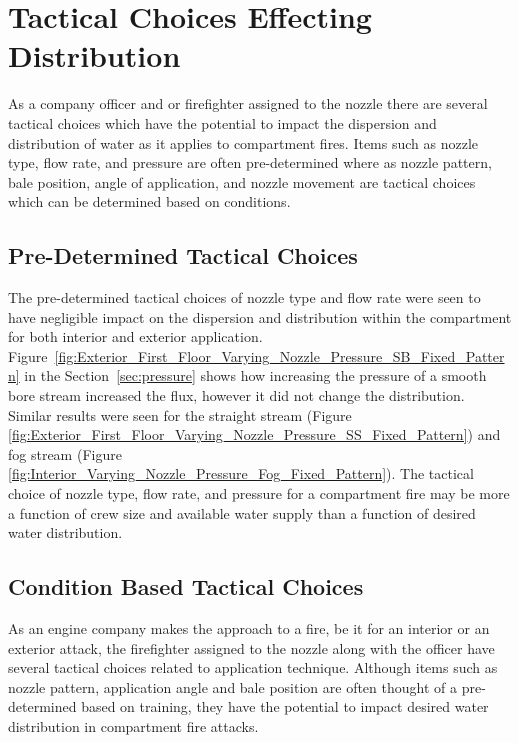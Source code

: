 \documentclass[12pt,oneside]{book}
\begin{document}
\section{Tactical Choices Effecting Distribution}

As a company officer and or firefighter assigned to the nozzle there are several tactical choices which have the potential to impact the dispersion and distribution of water as it applies to compartment fires. Items such as nozzle type, flow rate, and pressure are often pre-determined where as nozzle pattern, bale position, angle of application, and nozzle movement are tactical choices which can be determined based on conditions.  

\subsection{Pre-Determined Tactical Choices}
The pre-determined tactical choices of nozzle type and flow rate were seen to have negligible impact on the dispersion and distribution within the compartment for both interior and exterior application. Figure~\ref{fig:Exterior_First_Floor_Varying_Nozzle_Pressure_SB_Fixed_Pattern} in the Section~\ref{sec:pressure} shows how increasing the pressure of a smooth bore stream increased the flux, however it did not change the distribution. Similar results were seen for the straight stream (Figure \ref{fig:Exterior_First_Floor_Varying_Nozzle_Pressure_SS_Fixed_Pattern}) and fog stream (Figure \ref{fig:Interior_Varying_Nozzle_Pressure_Fog_Fixed_Pattern}). The tactical choice of nozzle type, flow rate, and pressure for a compartment fire may be more a function of crew size and available water supply than a function of desired water distribution. 

\subsection{Condition Based Tactical Choices}
As an engine company makes the approach to a fire, be it for an interior or an exterior attack, the firefighter assigned to the nozzle along with the officer have several tactical choices related to application technique. Although items such as nozzle pattern, application angle and bale position are often thought of a pre-determined based on training, they have the potential to impact desired water distribution in compartment fire attacks. 
\end{document}
